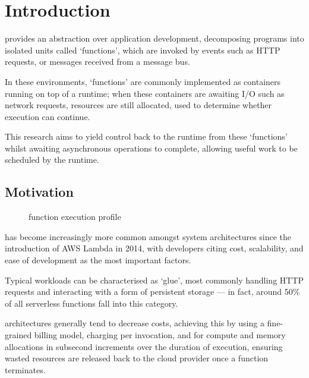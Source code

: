 \chapter{Introduction}

\faasxlong{} provides an abstraction over application development, decomposing programs into isolated units called `functions', which are invoked by events such as HTTP requests, or messages received from a message bus.

In these environments, `functions' are commonly implemented as containers running on top of a runtime; when these containers are awaiting I/O such as network requests, resources are still allocated, used to determine whether execution can continue.

This research aims to yield control back to the runtime from these `functions' whilst awaiting asynchronous operations to complete, allowing useful work to be scheduled by the runtime.

\section{Motivation}
\begin{figure}
    \begin{center}
        
    \end{center}
    \caption{\faas{} function execution profile}
\end{figure}

\faaslong{} has become increasingly more common amongst system architectures since the introduction of AWS Lambda\cite{aws-lambda} in 2014, with developers citing cost, scalability, and ease of development as the most important factors\cite{review-of-serverless-use-cases-and-characteristics}.

Typical \faas{} workloads can be characterised as `glue', most commonly handling HTTP requests and interacting with a form of persistent storage --- in fact, around 50\% of all serverless functions fall into this category\cite{review-of-serverless-use-cases-and-characteristics}.

\faas{} architectures generally tend to decrease costs, achieving this by using a fine-grained billing model, charging per invocation, and for compute and memory allocations in subsecond increments over the duration of execution, ensuring wasted resources are released back to the cloud provider once a function terminates.

